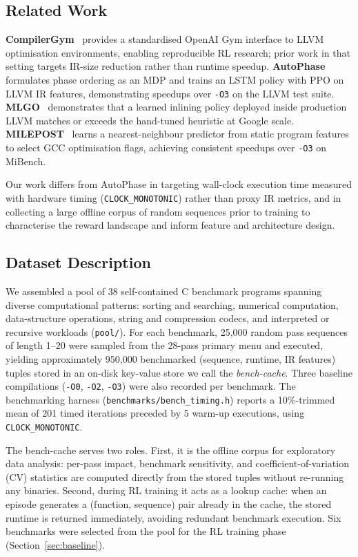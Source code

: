 \documentclass[conference]{IEEEtran}
\newcommand{\opt}[1]{\texttt{-O#1}}
\begin{document}
\subsection{Related Work}
\textbf{CompilerGym}~\cite{compilergym} provides a standardised
OpenAI Gym interface to LLVM optimisation environments, enabling reproducible
RL research; prior work in that setting targets IR-size reduction rather than
runtime speedup.
\textbf{AutoPhase}~\cite{autophase} formulates phase ordering as an MDP and
trains an LSTM policy with PPO on LLVM IR features, demonstrating speedups
over \opt{3} on the LLVM test suite.
\textbf{MLGO}~\cite{mlgo} demonstrates that a learned inlining policy deployed
inside production LLVM matches or exceeds the hand-tuned heuristic at Google
scale.
\textbf{MILEPOST}~\cite{milepost} learns a nearest-neighbour predictor from
static program features to select GCC optimisation flags, achieving consistent
speedups over \opt{3} on MiBench.

Our work differs from AutoPhase in targeting wall-clock execution time
measured with hardware timing (\texttt{CLOCK\_MONOTONIC}) rather than proxy
IR metrics, and in collecting a large offline corpus of random sequences
prior to training to characterise the reward landscape and inform feature
and architecture design.

\subsection{Dataset Description}
\label{sec:dataset}
We assembled a pool of 38 self-contained C benchmark programs spanning
diverse computational patterns: sorting and searching, numerical computation,
data-structure operations, string and compression codecs, and interpreted or
recursive workloads (\texttt{pool/}).
For each benchmark, 25{,}000 random pass sequences of length 1--20 were
sampled from the 28-pass primary menu and executed, yielding approximately
950{,}000 benchmarked (sequence, runtime, IR features) tuples stored in an
on-disk key-value store we call the \emph{bench-cache}.
Three baseline compilations (\opt{0}, \opt{2}, \opt{3}) were also recorded
per benchmark.
The benchmarking harness (\texttt{benchmarks/bench\_timing.h}) reports a
10\%-trimmed mean of 201 timed iterations preceded by 5 warm-up executions,
using \texttt{CLOCK\_MONOTONIC}.

The bench-cache serves two roles.
First, it is the offline corpus for exploratory data analysis: per-pass
impact, benchmark sensitivity, and coefficient-of-variation (CV) statistics
are computed directly from the stored tuples without re-running any binaries.
Second, during RL training it acts as a lookup cache: when an episode
generates a (function, sequence) pair already in the cache, the stored
runtime is returned immediately, avoiding redundant benchmark execution.
Six benchmarks were selected from the pool for the RL training phase
(Section~\ref{sec:baseline}).
\end{document}
